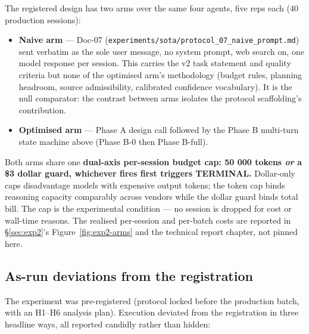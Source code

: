 \documentclass[a4paper,11pt]{article}
\providecommand{\tightlist}{%
  \setlength{\itemsep}{0pt}\setlength{\parskip}{0pt}}
\begin{document}
The registered design has two arms over the same four agents, five reps
each (40 production sessions):

\begin{itemize}
\tightlist
\item
  \textbf{Naive arm} --- Doc-07
  (\texttt{experiments/sota/protocol\_07\_naive\_prompt.md}) sent
  verbatim as the sole user message, no system prompt, web search on,
  one model response per session. This carries the v2 task statement and
  quality criteria but none of the optimised arm's methodology (budget
  rules, planning headroom, source admissibility, calibrated confidence
  vocabulary). It is the null comparator: the contrast between arms
  isolates the protocol scaffolding's contribution.
\item
  \textbf{Optimised arm} --- Phase A design call followed by the Phase B
  multi-turn state machine above (Phase B-0 then Phase B-full).
\end{itemize}

Both arms share one \textbf{dual-axis per-session budget cap: 50 000
tokens \emph{or} a \$3 dollar guard, whichever fires first triggers
TERMINAL.} Dollar-only caps disadvantage models with expensive output
tokens; the token cap binds reasoning capacity comparably across vendors
while the dollar guard binds total bill. The cap is the experimental
condition --- no session is dropped for cost or wall-time reasons. The
realised per-session and per-batch costs are reported in
§\ref{sec:exp2}'s Figure~\ref{fig:exp2-arms} and the technical report
chapter, not pinned here.

\subsection*{As-run deviations from the
registration}

The experiment was pre-registered (protocol locked before the production
batch, with an H1--H6 analysis plan). Execution deviated from the
registration in three headline ways, all reported candidly rather than
hidden:
\end{document}
